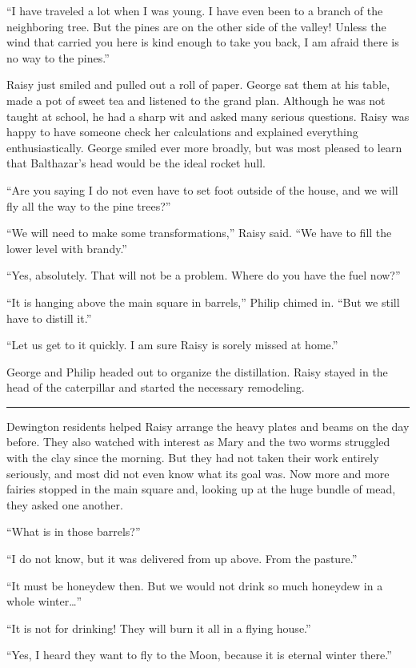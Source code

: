 \documentclass[10pt, draft]{memoir}
\renewcommand{\pfbreakdisplay}{\bigskip \ding{166} \bigskip}
\newcommand{\secbreak}{\fancybreak{\pfbreakdisplay}}
\begin{document}
``I have traveled a lot when I was young. I have even been to a branch of the neighboring tree. But the pines are on the other side of the valley! Unless the wind that carried you here is kind enough to take you back, I am afraid there is no way to the pines.''

Raisy just smiled and pulled out a roll of paper. George sat them at his table, made a pot of sweet tea and listened to the grand plan. Although he was not taught at school, he had a sharp wit and asked many serious questions. Raisy was happy to have someone check her calculations and explained everything enthusiastically. George smiled ever more broadly, but was most pleased to learn that Balthazar's head would be the ideal rocket hull.

``Are you saying I do not even have to set foot outside of the house, and we will fly all the way to the pine trees?''

``We will need to make some transformations,'' Raisy said. ``We have to fill the lower level with brandy.''

``Yes, absolutely. That will not be a problem. Where do you have the fuel now?''

``It is hanging above the main square in barrels,” Philip chimed in. “But we still have to distill it.''

``Let us get to it quickly. I am sure Raisy is sorely missed at home.''

George and Philip headed out to organize the distillation. Raisy stayed in the head of the caterpillar and started the necessary remodeling.

\secbreak

Dewington residents helped Raisy arrange the heavy plates and beams on the day before. They also watched with interest as Mary and the two worms struggled with the clay since the morning. But they had not taken their work entirely seriously, and most did not even know what its goal was. Now more and more fairies stopped in the main square and, looking up at the huge bundle of mead, they asked one another.

``What is in those barrels?''

``I do not know, but it was delivered from up above. From the pasture.''

``It must be honeydew then. But we would not drink so much honeydew in a whole winter\dots''

``It is not for drinking! They will burn it all in a flying house.''

``Yes, I heard they want to fly to the Moon, because it is eternal winter there.''
\end{document}
